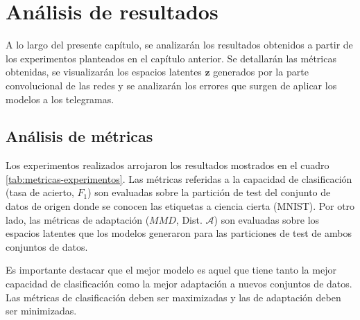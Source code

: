 \chapter{Análisis de resultados}

\label{Chapter4}

A lo largo del presente capítulo, se analizarán los resultados obtenidos a partir de los experimentos planteados en el
capítulo anterior. Se detallarán las métricas obtenidas, se visualizarán los espacios latentes $\mathbf{z}$ generados
por la parte convolucional de las redes y se analizarán los errores que surgen de aplicar los modelos a los telegramas.

\section{Análisis de métricas}

Los experimentos realizados arrojaron los resultados mostrados en el cuadro \ref{tab:metricas-experimentos}. Las
métricas referidas a la capacidad de clasificación (tasa de acierto, $F_1$) son evaluadas sobre la partición de test
del conjunto de datos de origen donde se conocen las etiquetas a ciencia cierta (MNIST). Por otro lado, las métricas de
adaptación ($MMD$, Dist. $\mathcal{A}$) son evaluadas sobre los espacios latentes que los modelos generaron para las
particiones de test de ambos conjuntos de datos.

Es importante destacar que el mejor modelo es aquel que tiene tanto la mejor capacidad de clasificación como la mejor
adaptación a nuevos conjuntos de datos. Las métricas de clasificación deben ser maximizadas y las de adaptación deben
ser minimizadas.

